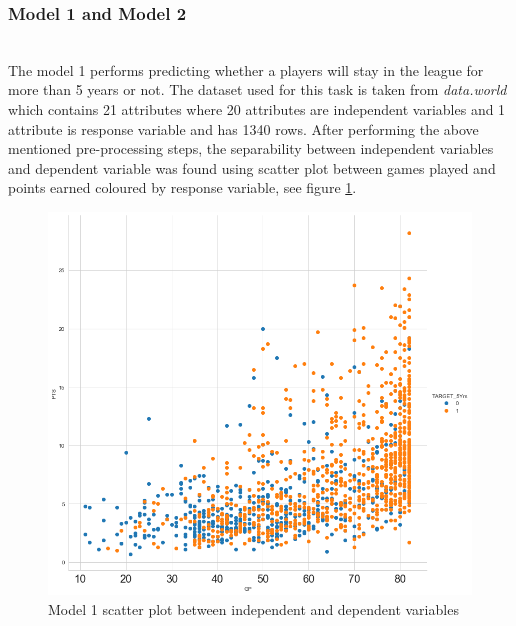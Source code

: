 \documentclass[format=sigconf]{acmart}
\begin{document}
\subsubsection{Model 1 and Model 2}
\hfill\\
The model 1 performs predicting whether a players will stay in the league for more than 5 years or not. The dataset used for this
task is taken from \textit{data.world} which contains 21 attributes where 20 attributes are independent variables and
1 attribute is response variable and has 1340 rows. After performing the above mentioned pre-processing steps, the separability
between independent variables and dependent variable was found using scatter plot between games played and points earned coloured by 
response variable, see figure \ref{fig:model1scatter}.
\begin{figure}[H]
    \centering
    \includegraphics[scale=0.25]{model_1_scatter_plot.png}
    \caption{Model 1 scatter plot between independent and dependent variables}
    \label{fig:model1scatter}
\end{figure}
\end{document}
